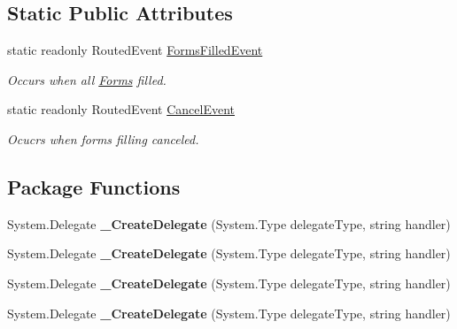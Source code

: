 \subsection*{Static Public Attributes}
\begin{DoxyCompactItemize}
\item 
static readonly Routed\+Event \mbox{\hyperlink{class_wpf_handler_1_1_u_i_1_1_controls_1_1_logon_1_1_registration_panel_afe33efe5602a8bb21a3385c9e13e3e48}{Forms\+Filled\+Event}}
\begin{DoxyCompactList}\small\item\em Occurs when all \mbox{\hyperlink{class_wpf_handler_1_1_u_i_1_1_controls_1_1_logon_1_1_registration_panel_ad67feb5ebac761e0e580b89a450b2e34}{Forms}} filled. \end{DoxyCompactList}\item 
static readonly Routed\+Event \mbox{\hyperlink{class_wpf_handler_1_1_u_i_1_1_controls_1_1_logon_1_1_registration_panel_a27f085f1c5216593bc730d5c2f43a6d3}{Cancel\+Event}}
\begin{DoxyCompactList}\small\item\em Ocucrs when forms filling canceled. \end{DoxyCompactList}\end{DoxyCompactItemize}
\subsection*{Package Functions}
\begin{DoxyCompactItemize}
\item 
\mbox{\label{class_wpf_handler_1_1_u_i_1_1_controls_1_1_logon_1_1_registration_panel_a73139da2616614c832bb2898d3ed5d64}} 
System.\+Delegate {\bfseries \+\_\+\+Create\+Delegate} (System.\+Type delegate\+Type, string handler)
\item 
\mbox{\label{class_wpf_handler_1_1_u_i_1_1_controls_1_1_logon_1_1_registration_panel_a73139da2616614c832bb2898d3ed5d64}} 
System.\+Delegate {\bfseries \+\_\+\+Create\+Delegate} (System.\+Type delegate\+Type, string handler)
\item 
\mbox{\label{class_wpf_handler_1_1_u_i_1_1_controls_1_1_logon_1_1_registration_panel_a73139da2616614c832bb2898d3ed5d64}} 
System.\+Delegate {\bfseries \+\_\+\+Create\+Delegate} (System.\+Type delegate\+Type, string handler)
\item 
\mbox{\label{class_wpf_handler_1_1_u_i_1_1_controls_1_1_logon_1_1_registration_panel_a73139da2616614c832bb2898d3ed5d64}} 
System.\+Delegate {\bfseries \+\_\+\+Create\+Delegate} (System.\+Type delegate\+Type, string handler)
\end{DoxyCompactItemize}
